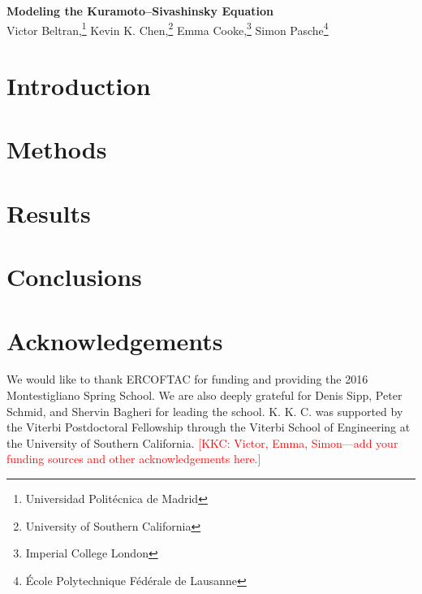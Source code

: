 \documentclass[11pt]{article}
\newcommand{\kkc}[1]{\textcolor{red}{[KKC: #1]}}
\begin{document}
\begin{center}
    {\bf \Large Modeling the Kuramoto--Sivashinsky Equation}\\
    \vspace{0.3cm}
    {%
        \large{%
            Victor Beltran,\footnote{Universidad Polit\'ecnica de Madrid}
            Kevin K. Chen,\footnote{University of Southern California}
            Emma Cooke,\footnote{Imperial College London}
            Simon Pasche\footnote{\'Ecole Polytechnique F\'ed\'erale de Lausanne}%
        }%
    }
\end{center}
\vspace{0.3cm}

\begin{abstract}
    The report should be around 6-8 pages in length. The deadline is on {\bf May, 31 2016.}
\end{abstract}

\section{Introduction}

\cite{KuramotoPTP76}
\cite{SivashinskyAA77}
\cite{ChaturantabutRice09a}
\cite{ChaturantabutIEEECDC09}
\cite{HolmesTCSDSS}
\cite{SirovichQAM87}
\cite{KevrekidisSIAMJAM90}
\cite{AubrySIAMJSC93}
\cite{RowleyPD00}

\section{Methods}

\section{Results}

\section{Conclusions}

\section{Acknowledgements}

We would like to thank ERCOFTAC for funding and providing the 2016 Montestigliano Spring School.
We are also deeply grateful for Denis Sipp, Peter Schmid, and Shervin Bagheri for leading the school.
K. K. C. was supported by the Viterbi Postdoctoral Fellowship through the Viterbi School of Engineering at the University of Southern California.
\kkc{Victor, Emma, Simon---add your funding sources and other acknowledgements here.}


\end{document}
